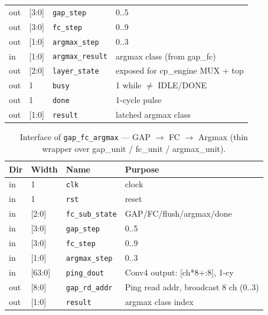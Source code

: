 \begin{table}[t]
\begin{tabular}{@{}llll@{}}
out & [3:0]  & \texttt{gap\_step}      & 0..5 \\
out & [3:0]  & \texttt{fc\_step}       & 0..9 \\
out & [1:0]  & \texttt{argmax\_step}   & 0..3 \\
in  & [1:0]  & \texttt{argmax\_result} & argmax class (from gap\_fc) \\
out & [2:0]  & \texttt{layer\_state}   & exposed for cp\_engine MUX + top \\
out & 1      & \texttt{busy}           & 1 while $\neq$ IDLE/DONE \\
out & 1      & \texttt{done}           & 1-cycle pulse \\
out & [1:0]  & \texttt{result}         & latched argmax class \\
\bottomrule
\end{tabular}
\end{table}


\begin{table}[t]
\centering
\caption{Interface of \texttt{gap\_fc\_argmax} — GAP $\to$ FC $\to$ Argmax
(thin wrapper over gap\_unit / fc\_unit / argmax\_unit).}
\label{tab:if-gap-fc}
\small
\setlength{\tabcolsep}{4pt}
\renewcommand{\arraystretch}{1.1}
\begin{tabular}{@{}llll@{}}
\toprule
\textbf{Dir} & \textbf{Width} & \textbf{Name} & \textbf{Purpose} \\
\midrule
in  & 1      & \texttt{clk}           & clock \\
in  & 1      & \texttt{rst}           & reset \\
in  & [2:0]  & \texttt{fc\_sub\_state}& GAP/FC/flush/argmax/done \\
in  & [3:0]  & \texttt{gap\_step}     & 0..5 \\
in  & [3:0]  & \texttt{fc\_step}      & 0..9 \\
in  & [1:0]  & \texttt{argmax\_step}  & 0..3 \\
in  & [63:0] & \texttt{ping\_dout}    & Conv4 output: [ch*8+:8], 1-cy \\
out & [8:0]  & \texttt{gap\_rd\_addr} & Ping read addr, broadcast 8 ch (0..3) \\
out & [1:0]  & \texttt{result}        & argmax class index \\
\bottomrule
\end{tabular}
\end{table}


